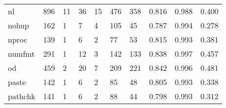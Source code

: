 \begin{longtable}{lp{2.0cm}p{2.0cm}p{2.0cm}p{2.0cm}p{2.0cm}p{2.0cm}p{2.0cm}p{2.0cm}p{2.0cm}}
nl        &                    896 &                                 11 &                                36 &                               15 &                               476 &                             358 &                                   0.816 &                                  0.988 &                                0.400 \\
nohup     &                    162 &                                  1 &                                 7 &                                4 &                               105 &                              45 &                                   0.787 &                                  0.994 &                                0.278 \\
nproc     &                    139 &                                  1 &                                 6 &                                2 &                                77 &                              53 &                                   0.815 &                                  0.993 &                                0.381 \\
numfmt    &                    291 &                                  1 &                                12 &                                3 &                               142 &                             133 &                                   0.838 &                                  0.997 &                                0.457 \\
od        &                    459 &                                  2 &                                20 &                                7 &                               209 &                             221 &                                   0.842 &                                  0.996 &                                0.481 \\
paste     &                    142 &                                  1 &                                 6 &                                2 &                                85 &                              48 &                                   0.805 &                                  0.993 &                                0.338 \\
pathchk   &                    141 &                                  1 &                                 6 &                                2 &                                88 &                              44 &                                   0.798 &                                  0.993 &                                0.312 \\

\end{longtable}
